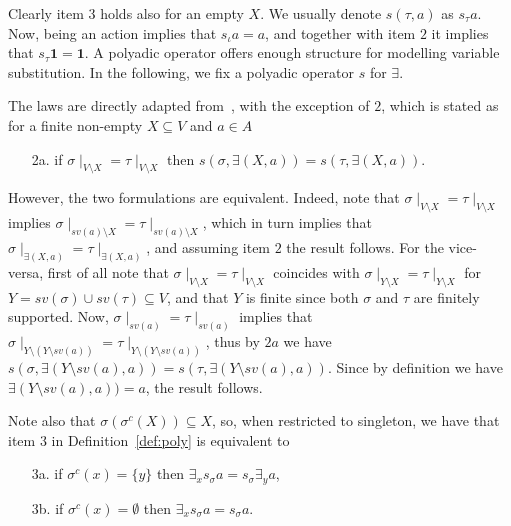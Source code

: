 \documentclass{llncs}
\def\monid{{\mathbf 0}}
\def\monid{\mathbf{1}}
\begin{document}
Clearly item $3$ holds also for an empty $X$.
%
We usually denote $s(\tau,a)$ as $s_\tau a$.
Now, being an action implies that $s_\iota a = a$, and 
together with item $2$ it implies that $s_{\tau} \monid = \monid$.
A polyadic operator offers enough structure for modelling variable substitution. 
%
In the following, we fix a polyadic operator $s$ for $\exists$.

\begin{remark}
The laws are directly adapted from~\cite{sagi2013}, with the exception of $2$, which 
is stated as for a finite non-empty $X \subseteq V$ and $a \in A$
	\begin{itemize}
          \item[2a.] if $\sigma \mid_{V \setminus X} = \tau \mid_{V \setminus X}$ 
		         then $s(\sigma, \exists (X, a)) = s(\tau, \exists (X, a))$.
        \end{itemize}
However, the two formulations are equivalent. Indeed, note that
$\sigma \mid_{V \setminus X} = \tau \mid_{V \setminus X}$ implies 
$\sigma \mid_{sv(a) \setminus X} = \tau \mid_{sv(a) \setminus X}$, 
which in turn implies that 
$\sigma \mid_{\exists (X, a)} = \tau \mid_{\exists (X, a)}$, and 
assuming item $2$ the result follows.
%
For the vice-versa, first of all note that 
$\sigma \mid_{V \setminus X} = \tau \mid_{V \setminus X}$
coincides with $\sigma \mid_{Y \setminus X} = \tau \mid_{Y \setminus X}$
for $Y = sv(\sigma) \cup sv(\tau) \subseteq V$, and that $Y$ is finite
since both $\sigma$ and $\tau$ are finitely supported.
Now, $\sigma \mid_{sv(a)} = \tau \mid_{sv(a)}$ implies that 
$\sigma \mid_{Y \setminus (Y \setminus sv(a))} = \tau \mid_{Y \setminus (Y \setminus sv(a))}$,
thus by $2a$ we have 
$s(\sigma, \exists (Y \setminus sv(a), a)) = s(\tau, \exists (Y \setminus sv(a), a))$.
Since by definition we have $\exists (Y \setminus sv(a), a)) = a$, the result follows.
\end{remark}

\begin{remark}
Note also that $\sigma(\sigma^{c}(X)) \subseteq X$, so, when restricted to singleton, we have that item $3$ in Definition~\ref{def:poly} is equivalent to
\begin{itemize}
          \item[3a.]if $\sigma^{c}(x) = \{y\}$ then $\exists_x s_{\sigma} a =  s_\sigma \exists_y a$,
          \item[3b.] if $\sigma^{c}(x) = \emptyset$ then $\exists_x s_{\sigma} a =  s_\sigma a$.
\end{itemize}
\end{remark}
\end{document}
